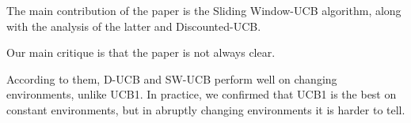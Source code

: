 The main contribution of the paper is the Sliding Window-UCB algorithm, along with the analysis of the latter and Discounted-UCB.

Our main critique is that the paper is not always clear.

According to them, D-UCB and SW-UCB perform well on changing environments, unlike UCB1. In practice, we confirmed that UCB1 is the best on constant environments, but in abruptly changing environments it is harder to tell.